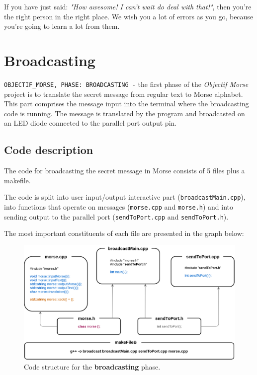 \documentclass[12pt]{report}
\begin{document}
If you have just said: \textit{"How awesome! I can't wait do deal with that!"}, then you're the right person in the right place. We wish you a lot of errors as you go, because you're going to learn a lot from them. 

\newpage

\chapter{Broadcasting}

\verb|OBJECTIF_MORSE, PHASE: BROADCASTING -| the first phase of the \textit{Objectif Morse} project is to translate the secret message from regular text to Morse alphabet. This part comprises the message input into the terminal where the broadcasting code is running. The message is translated by the program and broadcasted on an LED diode connected to the parallel port output pin.

\section{Code description}

The code for broadcasting the secret message in Morse consists of 5 files plus a makefile.

The code is split into user input/output interactive part (\verb|broadcastMain.cpp|), into functions that operate on messages (\verb|morse.cpp| and \verb|morse.h|) and into sending output to the parallel port (\verb|sendToPort.cpp| and \verb|sendToPort.h|).

The most important constituents of each file are presented in the graph below:

\begin{figure}[H]
\centering\includegraphics[width=14.5cm]{bCodeStructure}
\caption{Code structure for the \textbf{broadcasting} phase.}				
\label{fig:br_code}
\end{figure}
\end{document}
